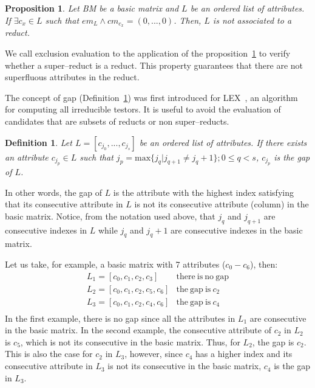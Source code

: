 \documentclass[authoryear,preprint,review,12pt]{elsarticle}
\newtheorem{proposition}{Proposition}
\newtheorem{definition}{Definition}
\begin{document}
	\begin{proposition}\label{prop:exclude} 
		Let BM be a basic matrix and $L$ be an ordered list of attributes. If $\exists c_x \in L$ such that $em_{L} \wedge cm_{c_x}=(0,...,0)$. Then, $L$ is not associated to a reduct.
	\end{proposition}
	
	We call exclusion evaluation to the application of the proposition~\ref{prop:exclude} to verify whether a super--reduct is a reduct. This property guarantees that there are not superfluous attributes in the reduct. 
	
	The concept of gap (Definition~\ref{def:gap}) was first introduced for LEX~\citep{Santiesteban03}, an algorithm for computing all irreducible testors. It is useful to avoid the evaluation of candidates that are subsets of reducts or non super--reducts.
				
	\begin{definition}\label{def:gap}
		Let $L = [c_{j_0},...,c_{j_s}]$ be an ordered list of attributes. If there exists an attribute $c_{j_p} \in L$ such that ${j_p}=\mathrm{max}\{j_q | j_{q+1} \neq j_q+1\}; 0 \leq q < s$, $c_{j_p}$ is the gap of $L$.
	\end{definition}
	
	In other words, the gap of $L$ is the attribute with the highest index satisfying that its consecutive attribute in $L$ is not its consecutive attribute (column) in the basic matrix. Notice, from the notation used above, that $j_q$ and $j_{q+1}$ are consecutive indexes in $L$ while $j_q$ and $j_q+1$ are consecutive indexes in the basic matrix.
	
	Let us take, for example, a basic matrix with 7 attributes ($c_0 - c_6$), then:
	$$\begin{array}{ll}
	{L_1=[c_0,c_1,c_2,c_3]} 		& \mathrm{there~is~no~gap}\\
	{L_2=[c_0,c_1,c_2,c_5,c_6]} 	& \mathrm{the~gap~is~} c_2\\
	{L_3=[c_0,c_1,c_2,c_4,c_6]} 	& \mathrm{the~gap~is~} c_4\\
	\end{array}$$
	In the first example, there is no gap since all the attributes in $L_1$ are consecutive in the basic matrix. In the second example, the consecutive attribute of $c_2$ in $L_2$ is $c_5$, which is not its consecutive in the basic matrix. Thus, for $L_2$, the gap is $c_2$. This is also the case for $c_2$ in $L_3$, however, since $c_4$ has a higher index and its consecutive attribute in $L_3$ is not its consecutive in the basic matrix, $c_4$ is the gap in $L_3$.
\end{document}
